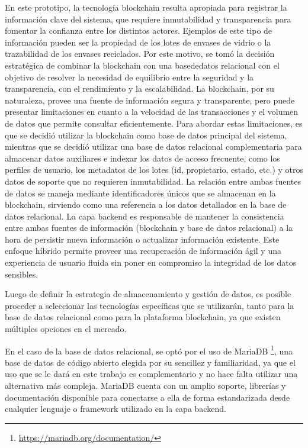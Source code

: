 En este prototipo, la tecnología blockchain resulta apropiada para registrar la información clave del sistema, que requiere inmutabilidad y transparencia para fomentar la confianza entre los distintos actores. Ejemplos de este tipo de información pueden ser la propiedad de los lotes de envases de vidrio o la \gls{trazabilidad} de los envases reciclados. Por este motivo, se tomó la decisión estratégica de combinar la blockchain con una \gls{basededatos} relacional con el objetivo de resolver la necesidad de equilibrio entre la seguridad y la transparencia, con el rendimiento y la escalabilidad. La blockchain, por su naturaleza, provee una fuente de información segura y transparente, pero puede presentar limitaciones en cuanto a la velocidad de las transacciones y el volumen de datos que permite consultar eficientemente. Para abordar estas limitaciones, es que se decidió utilizar la blockchain como base de datos principal del sistema, mientras que se decidió utilizar una base de datos relacional complementaria para almacenar datos auxiliares e indexar los datos de acceso frecuente, como los perfiles de usuario, los metadatos de los lotes (id, propietario, estado, etc.) y otros datos de soporte que no requieren inmutabilidad. La relación entre ambas fuentes de datos se maneja mediante identificadores únicos que se almacenan en la blockchain, sirviendo como una referencia a los datos detallados en la base de datos relacional. La capa \gls{backend} es responsable de mantener la consistencia entre ambas fuentes de información (blockchain y base de datos relacional) a la hora de persistir nueva información o actualizar información existente. Este enfoque híbrido permite proveer una recuperación de información ágil y una experiencia de usuario fluida sin poner en compromiso la integridad de los datos sensibles.

Luego de definir la estrategia de almacenamiento y gestión de datos, es posible proceder a seleccionar las tecnologías específicas que se utilizarán, tanto para la base de datos relacional como para la plataforma blockchain, ya que existen múltiples opciones en el mercado.

En el caso de la base de datos relacional, se optó por el uso de MariaDB \footnote{\url{https://mariadb.org/documentation/}}, una base de datos de código abierto elegida por su sencillez y familiaridad, ya que el uso que se le dará en este trabajo es complementario y no hace falta utilizar una alternativa más compleja. MariaDB cuenta con un amplio soporte, librerías y documentación disponible para conectarse a ella de forma estandarizada desde cualquier lenguaje o framework utilizado en la capa backend.

